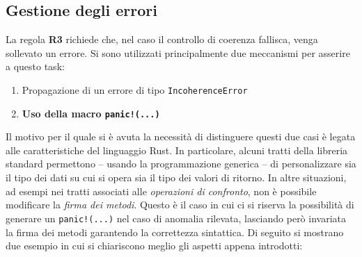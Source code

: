 \subsection{Gestione degli errori}
La regola \textbf{R3} richiede che, nel caso il controllo di coerenza fallisca, venga sollevato un errore. Si sono utilizzati principalmente due meccanismi per asserire a questo task:
\begin{enumerate}
    \item Propagazione di un errore di tipo \texttt{IncoherenceError} 
    \item \textbf{Uso della macro \texttt{panic!(...)}}
\end{enumerate}
Il motivo per il quale si è avuta la necessità di distinguere questi due casi è legata alle caratteristiche del linguaggio Rust. In particolare, alcuni tratti della libreria standard permettono -- usando la programmazione generica -- di personalizzare sia il tipo dei dati su cui si opera sia il tipo dei valori di ritorno. In altre situazioni, ad esempi nei tratti associati alle \textit{operazioni di confronto}, non è possibile modificare la \textit{firma dei metodi}. Questo è il caso in cui ci si riserva la possibilità di generare un \texttt{panic!(...)} nel caso di anomalia rilevata, lasciando però invariata la firma dei metodi garantendo la correttezza sintattica.
Di seguito si mostrano due esempio in cui si chiariscono meglio gli aspetti appena introdotti: 

